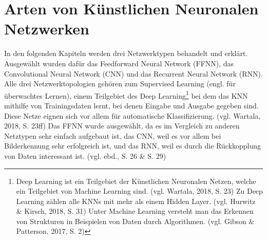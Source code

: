 \documentclass[a4paper,12pt,ngerman,oneside]{scrreprt}	%
\begin{document}
				
		\section{Arten von Künstlichen Neuronalen Netzwerken}\label{Arten}
		In den folgenden Kapiteln werden drei Netzwerktypen behandelt und erklärt. Ausgewählt wurden dafür das Feedforward Neural Network (FFNN), das Convolutional Neural Network (CNN) und das Recurrent Neural Network (RNN). Alle drei Netzwerktopologien gehören zum Supervised Learning (engl. für überwachtes Lernen), einem Teilgebiet des Deep Learning\footnote{Deep Learning ist ein Teilgebiet der Künstlichen Neuronalen Netzen, welche ein Teilgebiet von Machine Learning sind. (vgl. Wartala, 2018, S. 23) Zu Deep Learning zählen alle KNNs mit mehr als einem Hidden Layer. (vgl. Hurwitz \& Kirsch, 2018, S. 31) Unter Machine Learning versteht man das Erkennen von Strukturen in Beispielen von Daten durch Algorithmen. (vgl. Gibson \& Patterson, 2017, S. 2) } bei dem das KNN mithilfe von Trainingsdaten lernt, bei denen Eingabe und Ausgabe gegeben sind. Diese Netze eignen sich vor allem für automatische Klassifizierung. (vgl. Wartala, 2018, S. 23ff) Das FFNN wurde ausgewählt, da es im Vergleich zu anderen Netztypen sehr einfach aufgebaut ist, das CNN, weil es vor allem bei Bilderkennung sehr erfolgreich ist, und das RNN, weil es durch die Rückkopplung von Daten interessant ist. (vgl. ebd., S. 26 \& S. 29)
		
\end{document}
